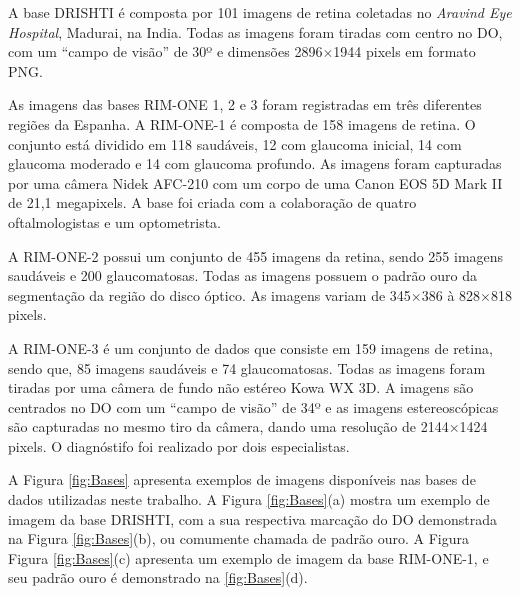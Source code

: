 \documentclass[fleqn,10pt]{SelfArx} %
\begin{document}
A base DRISHTI é composta por 101 imagens de retina  coletadas no \textit{Aravind Eye Hospital}, Madurai, na India. Todas as imagens foram tiradas com centro no DO, com um ``campo de visão'' de 30º e dimensões 2896$\times$1944 pixels em formato PNG. 


As imagens das bases RIM-ONE 1, 2 e 3 foram registradas em três diferentes regiões da Espanha. A RIM-ONE-1 é composta de 158 imagens de retina. O conjunto está dividido em 118 saudáveis, 12 com glaucoma inicial, 14 com glaucoma moderado e 14 com glaucoma profundo. As imagens foram capturadas por uma câmera Nidek AFC-210 com um corpo de uma Canon EOS 5D Mark II de 21,1 megapixels. A base foi criada com a colaboração de quatro oftalmologistas e um optometrista.

A RIM-ONE-2 possui um conjunto de 455 imagens da retina, sendo 255 imagens saudáveis e 200 glaucomatosas. Todas as imagens possuem o padrão ouro da segmentação da região do disco óptico. As imagens variam de 345$\times$386 à 828$\times$818 pixels.


A RIM-ONE-3 é um conjunto de dados que consiste em 159 imagens de retina, sendo que, 85 imagens saudáveis e 74 glaucomatosas. Todas as imagens foram tiradas por uma câmera de fundo não estéreo Kowa WX 3D. A imagens são centrados no DO com um ``campo de visão'' de 34º e as imagens estereoscópicas são capturadas no mesmo tiro da câmera, dando uma resolução de 2144$\times$1424 pixels. O diagnóstifo foi realizado por dois especialistas.

A Figura \ref{fig:Bases} apresenta exemplos de imagens disponíveis nas bases de dados utilizadas neste trabalho. A Figura \ref{fig:Bases}(a) mostra um exemplo de imagem da base DRISHTI, com a sua respectiva marcação do DO demonstrada na Figura \ref{fig:Bases}(b), ou comumente chamada de padrão ouro. A Figura Figura \ref{fig:Bases}(c) apresenta um exemplo de imagem da base RIM-ONE-1, e seu padrão ouro é demonstrado na \ref{fig:Bases}(d). 


\begin{figure*}[h!]
	\centering
	\caption{Exemplos de imagens das bases de dados: (a) DRISHTI, (b) Padrão Ouro DRISHTI, (c) RIM-ONE-1 e (d) Padrão ouro RIM-ONE-1.}
	\label{fig:Bases}
\end{figure*}
\end{document}

